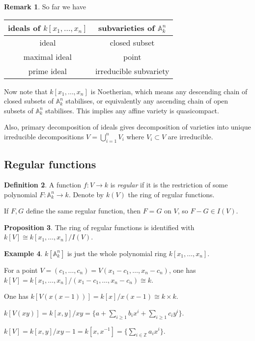 \documentclass{article}
\newcommand{\Z}{\mathbb{Z}}
\newcommand{\A}{\mathbb{A}}
\theoremstyle{definition}
\newtheorem{defn}{Definition}[subsection]
\newtheorem{prop}[defn]{Proposition}
\newtheorem{example}[defn]{Example}
\newtheorem{remark}[defn]{Remark}
\begin{document}
\begin{remark}
So far we have

\begin{table}[h]
\centering
\begin{tabular}{c|c}
ideals of $k[x_1,\ldots,x_n]$ & subvarieties of $\A_k^n$ \\ \hline
ideal           & closed subset            \\
maximal ideal   & point                    \\
prime ideal     & irreducible subvariety  
\end{tabular}
\end{table}

Now note that $k[x_1,\ldots,x_n]$ is Noetherian, which means any descending chain of closed subsets of $\A_k^n$ stabilises, or equivalently any ascending chain of open subsets of $\A_k^n$ stabilises. This implies any affine variety is quasicompact.

Also, primary decomposition of ideals gives decomposition of varieties into unique irreducible decompositions $V=\bigcup_{i=1}^n V_i$ where $V_i\subset V$ are irreducible.
\end{remark}

\subsection{Regular functions}
\begin{defn}
A function $f:V\rightarrow k$ is \textit{regular} if it is the restriction of some polynomial $F:\A_k^n\rightarrow k$. Denote by $k(V)$ the ring of regular functions.

If $F,G$ define the same regular function, then $F=G$ on $V$, so $F-G\in I(V)$.
\end{defn}

\begin{prop}
The ring of regular functions is identified with $k[V]\cong k[x_1,\ldots,x_n]/I(V)$.
\end{prop}

\begin{example}
\label{example:ringofregfunc}
$k[\A_k^n]$ is just the whole polynomial ring $k[x_1,\ldots,x_n]$.

For a point $V=(c_1,\ldots,c_n)=V(x_1-c_1,\ldots,x_n-c_n)$, one has $k[V]=k[x_1,\ldots,x_n]/(x_1-c_1,\ldots,x_n-c_n)\cong k$.

One has $k[V(x(x-1))]=k[x]/x(x-1)\cong k\times k$.

$k[V(xy)]=k[x,y]/xy=\{a+\sum_{i\geq 1}b_ix^i+\sum_{i\geq 1}c_iy^i\}$.

$k[V]=k[x,y]/xy-1=k[x,x^{-1}]=\{\sum_{i\in\Z}a_ix^i\}$.
\end{example}
\end{document}
